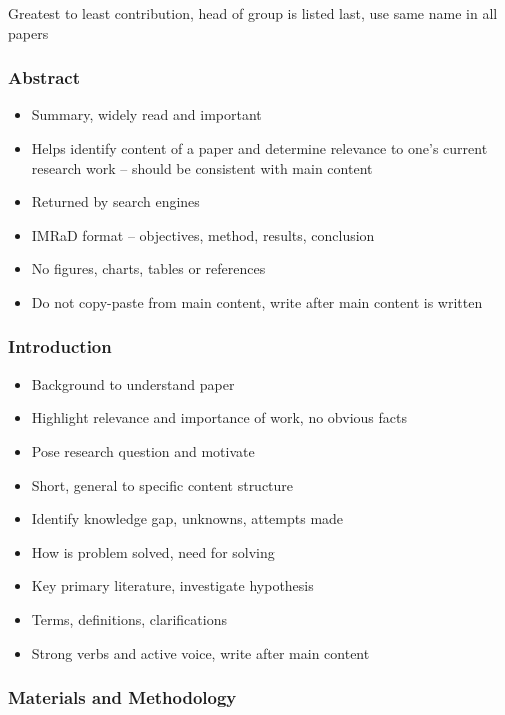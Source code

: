 \documentclass{article}
\begin{document}
Greatest to least contribution, head of group is listed last, use same name in all papers

\subsubsection{Abstract}

\begin{itemize}
    \item Summary, widely read and important
    \item Helps identify content of a paper and determine relevance to one's current research work -- should be consistent with main content
    \item Returned by search engines
    \item IMRaD format -- objectives, method, results, conclusion
    \item No figures, charts, tables or references
    \item Do not copy-paste from main content, write after main content is written
\end{itemize}

\subsubsection{Introduction}

\begin{itemize}
    \item Background to understand paper
    \item Highlight relevance and importance of work, no obvious facts
    \item Pose research question and motivate
    \item Short, general to specific content structure
    \item Identify knowledge gap, unknowns, attempts made
    \item How is problem solved, need for solving
    \item Key primary literature, investigate hypothesis
    \item Terms, definitions, clarifications
    \item Strong verbs and active voice, write after main content
\end{itemize}

\subsubsection{Materials and Methodology}
\end{document}
